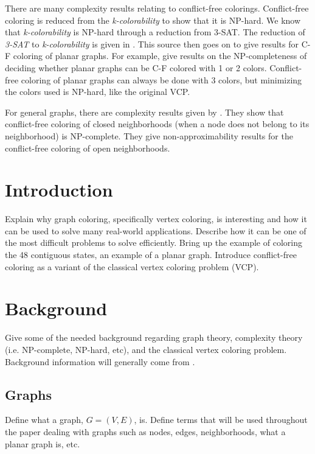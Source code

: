 \documentclass{sig-alternate}
\begin{document}
There are many complexity results relating to conflict-free colorings. Conflict-free coloring is reduced from the \emph{k-colorability} to show that it is NP-hard. We know that \emph{k-colorability} is NP-hard through a reduction from 3-SAT. The reduction of \emph{3-SAT} to \emph{k-colorability} is given in \cite{sharma2012new}. This source then goes on to give results for C-F coloring of planar graphs. For example, \cite{abel2017three} give results on the NP-completeness of deciding whether planar graphs can be C-F colored with 1 or 2 colors. Conflict-free coloring of planar graphs can always be done with 3 colors, but minimizing the colors used is NP-hard, like the original VCP.

For general graphs, there are complexity results given by \cite{gargano2015complexity}. They show that conflict-free coloring of closed neighborhoods (when a node does not belong to its neighborhood) is NP-complete. They give non-approximability results for the conflict-free coloring of open neighborhoods.

\section{Introduction}
\label{sec:introduction}
Explain why graph coloring, specifically vertex coloring, is interesting and how it can be used to solve many real-world applications. Describe how it can be one of the most difficult problems to solve efficiently. Bring up the example of coloring the 48 contiguous states, an example of a planar graph. Introduce conflict-free coloring as a variant of the classical vertex coloring problem (VCP).


\section{Background}
\label{sec:background}
Give some of the needed background regarding graph theory, complexity theory (i.e. NP-complete, NP-hard, etc), and the classical vertex coloring problem. Background information will generally come from \cite{bondy1976graph}.

\subsection{Graphs}
\label{sec:graphs}
Define what a graph, \(G = (V, E)\), is. Define terms that will be used throughout the paper dealing with graphs such as nodes, edges, neighborhoods, what a planar graph is, etc.
\end{document}
